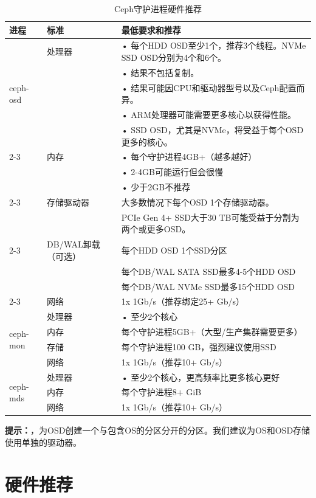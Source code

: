 \documentclass[12pt,UTF8]{ctexbook}
\begin{document}
\begin{table}[htbp]
\centering
\caption{Ceph守护进程硬件推荐}
\begin{tabular}{|l|l|l|}
\hline
\textbf{进程} & \textbf{标准} & \textbf{最低要求和推荐} \\
\hline
\multirow{5}{*}{ceph-osd} & 处理器 & • 每个HDD OSD至少1个，推荐3个线程。NVMe SSD OSD分别为4个和6个。 \\
& & • 结果不包括复制。 \\
& & • 结果可能因CPU和驱动器型号以及Ceph配置而异。 \\
& & • ARM处理器可能需要更多核心以获得性能。 \\
& & • SSD OSD，尤其是NVMe，将受益于每个OSD更多的核心。 \\
\cline{2-3}
& 内存 & • 每个守护进程4GB+（越多越好） \\
& & • 2-4GB可能运行但会很慢 \\
& & • 少于2GB不推荐 \\
\cline{2-3}
& 存储驱动器 & 大多数情况下每个OSD 1个存储驱动器。 \\
& & PCIe Gen 4+ SSD大于30 TB可能受益于分割为两个或更多OSD。 \\
\cline{2-3}
& DB/WAL卸载（可选） & 每个HDD OSD 1个SSD分区 \\
& & 每个DB/WAL SATA SSD最多4-5个HDD OSD \\
& & 每个DB/WAL NVMe SSD最多15个HDD OSD \\
\cline{2-3}
& 网络 & 1x 1Gb/s（推荐绑定25+ Gb/s） \\
\hline
\multirow{4}{*}{ceph-mon} & 处理器 & • 至少2个核心 \\
\cline{2-3}
& 内存 & 每个守护进程5GB+（大型/生产集群需要更多） \\
\cline{2-3}
& 存储 & 每个守护进程100 GB，强烈建议使用SSD \\
\cline{2-3}
& 网络 & 1x 1Gb/s（推荐10+ Gb/s） \\
\hline
\multirow{4}{*}{ceph-mds} & 处理器 & • 至少2个核心，更高频率比更多核心更好 \\
\cline{2-3}
& 内存 & 每个守护进程8+ GiB \\
\cline{2-3}
& 网络 & 1x 1Gb/s（推荐10+ Gb/s） \\
\hline
\end{tabular}
\end{table}

\textbf{提示：}，为OSD创建一个与包含OS的分区分开的分区。我们建议为OS和OSD存储使用单独的驱动器。

\section{硬件推荐}
\end{document}
